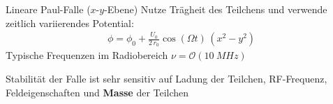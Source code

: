 \documentclass[12pt,xcolor=dvipsnames]{beamer}
\begin{document}
%		

\begin{frame}{Lineare Paul-Falle ($x$-$y$-Ebene)}
	Nutze Trägheit des Teilchens und verwende zeitlich variierendes Potential:
	\begin{align}
		\phi = \phi_0 + \frac{U_0}{2 \, r_0} \cos(\Omega t) \, (x^2-y^2)
	\end{align}
	Typische Frequenzen im Radiobereich $\nu = \mathcal{O}(\SI{10}{MHz})$
	
	Stabilität der Falle ist sehr sensitiv auf Ladung der Teilchen, RF-Frequenz, Feldeigenschaften und \textbf{Masse} der Teilchen
\end{frame}
\end{document}
